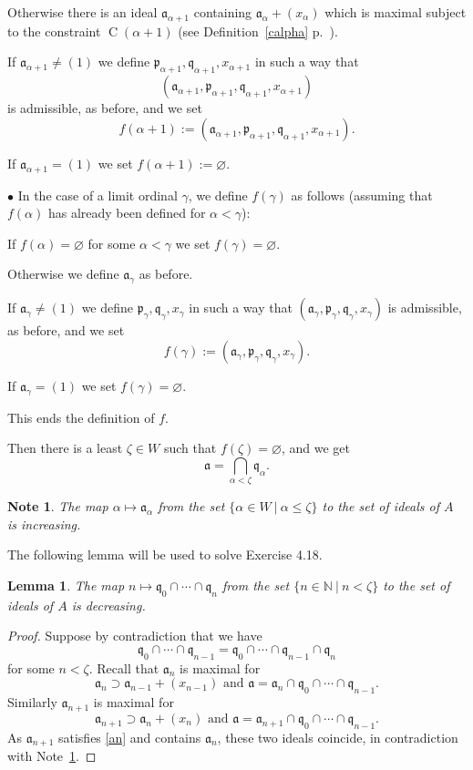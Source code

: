 \documentclass[parskip=half,fontsize=12pt]{scrartcl}%
\newcommand{\oo}{\operatorname}\newcommand{\ooo}{\operatorname*}
\newcommand{\mf}{\mathfrak}
\newcommand{\aaa}{\mf a}
\newcommand{\ppp}{\mf p}
\newcommand{\qqq}{\mf q}
\newcommand{\bu}{\bullet}
\newtheorem{lem}[thm]{Lemma}
\newtheorem{note}[thm]{Note}
\begin{document}
Otherwise there is an ideal $\aaa_{\alpha+1}$ containing $\aaa_\alpha+(x_\alpha)$ which is maximal subject to the constraint $\oo C(\alpha+1)$ (see Definition~\ref{calpha} p.~\pageref{calpha}). 

If $\aaa_{\alpha+1}\ne(1)$ we define $\ppp_{\alpha+1},\qqq_{\alpha+1},x_{\alpha+1}$ in such a way that 
$$
(\aaa_{\alpha+1},\ppp_{\alpha+1},\qqq_{\alpha+1},x_{\alpha+1})
$$ 
is admissible, as before, and we set 
$$
f(\alpha+1):=(\aaa_{\alpha+1},\ppp_{\alpha+1},\qqq_{\alpha+1},x_{\alpha+1}).
$$ 

If $\aaa_{\alpha+1}=(1)$ we set $f(\alpha+1):=\varnothing$.

$\bu$ In the case of a limit ordinal $\gamma$, we define $f(\gamma)$ as follows (assuming that $f(\alpha)$ has already been defined for $\alpha<\gamma$):

If $f(\alpha)=\varnothing$ for some $\alpha<\gamma$ we set $f(\gamma)=\varnothing$.

Otherwise we define $\aaa_\gamma$ as before.

If $\aaa_\gamma\ne(1)$ we define $\ppp_\gamma,\qqq_\gamma,x_\gamma$ in such a way that $(\aaa_\gamma,\ppp_\gamma,\qqq_\gamma,x_\gamma)$ is admissible, as before, and we set 
$$
f(\gamma):=(\aaa_{\gamma},\ppp_{\gamma},\qqq_{\gamma},x_{\gamma}).
$$ 

If $\aaa_\gamma=(1)$ we set $f(\gamma)=\varnothing$.

This ends the definition of $f$.

Then there is a least $\zeta\in W$ such that $f(\zeta)=\varnothing$, and we get 
\begin{equation}\label{abak}
\aaa=\bigcap_{\alpha<\zeta}\qqq_\alpha.
\end{equation} 
\begin{note}\label{amaa}
The map $\alpha\mapsto\aaa_\alpha$ from the set $\{\alpha\in W\ |\ \alpha\le\zeta\}$ to the set of ideals of $A$ is increasing.
\end{note} 
The following lemma will be used to solve Exercise 4.18. 
\begin{lem}\label{lasker}
The map $n\mapsto\qqq_0\cap\cdots\cap\qqq_n$ from the set $\{n\in\mathbb N\ |\ n<\zeta\}$ to the set of ideals of $A$ is decreasing.
\end{lem}
\begin{proof}
Suppose by contradiction that we have 
$$
\qqq_0\cap\cdots\cap\qqq_{n-1}=\qqq_0\cap\cdots\cap\qqq_{n-1}\cap\qqq_n
$$ 
for some $n<\zeta$. Recall that $\aaa_n$ is maximal for 
\begin{equation}\label{an}
\aaa_n\supset\aaa_{n-1}+(x_{n-1})\text{ and }\aaa=\aaa_n\cap\qqq_0\cap\cdots\cap\qqq_{n-1}.
\end{equation} 
Similarly $\aaa_{n+1}$ is maximal for 
$$%
\aaa_{n+1}\supset\aaa_n+(x_n)\text{ and }\aaa=\aaa_{n+1}\cap\qqq_0\cap\cdots\cap\qqq_{n-1}.
$$%
As $\aaa_{n+1}$ satisfies \eqref{an} and contains $\aaa_n$, these two ideals coincide, in contradiction with Note~\ref{amaa}. 
\end{proof}
\end{document}
